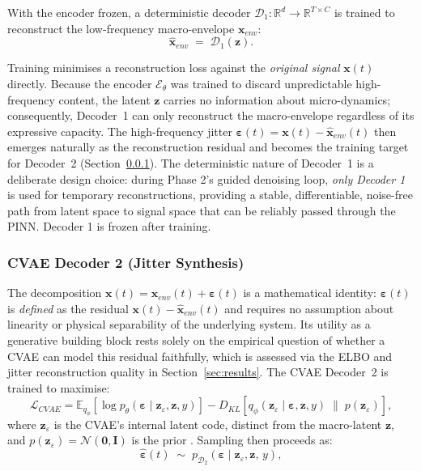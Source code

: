 \documentclass[conference]{IEEEtran}
\newcommand{\Enc}{\mathcal{E}}
\newcommand{\DecOne}{\mathcal{D}_1}
\newcommand{\DecTwo}{\mathcal{D}_2}
\newcommand{\z}{\mathbf{z}}
\newcommand{\x}{\mathbf{x}}
\begin{document}
With the encoder frozen, a deterministic decoder $\DecOne:\mathbb{R}^d\to\mathbb{R}^{T\times C}$ is trained to reconstruct the low-frequency macro-envelope $\x_{env}$:
\begin{equation}
  \hat{\x}_{env} \;=\; \DecOne(\z).
  \label{eq:dec1}
\end{equation}

Training minimises a reconstruction loss against the \emph{original signal} $\x(t)$ directly. Because the encoder $\Enc_\theta$ was trained to discard unpredictable high-frequency content, the latent $\z$ carries no information about micro-dynamics; consequently, Decoder~1 can only reconstruct the macro-envelope regardless of its expressive capacity. The high-frequency jitter $\boldsymbol{\varepsilon}(t)=\x(t)-\hat{\x}_{env}(t)$ then emerges naturally as the reconstruction residual and becomes the training target for Decoder~2 (Section~\ref{sec:arch_d2}). The deterministic nature of Decoder~1 is a deliberate design choice: during Phase 2's guided denoising loop, \emph{only Decoder 1} is used for temporary reconstructions, providing a stable, differentiable, noise-free path from latent space to signal space that can be reliably passed through the PINN. Decoder 1 is frozen after training.

\subsubsection{CVAE Decoder 2 (Jitter Synthesis)}
\label{sec:arch_d2}

The decomposition $\x(t)=\x_{env}(t)+\boldsymbol{\varepsilon}(t)$ is a mathematical identity: $\boldsymbol{\varepsilon}(t)$ is \emph{defined} as the residual $\x(t)-\hat{\x}_{env}(t)$ and requires no assumption about linearity or physical separability of the underlying system. Its utility as a generative building block rests solely on the empirical question of whether a CVAE can model this residual faithfully, which is assessed via the ELBO and jitter reconstruction quality in Section~\ref{sec:results}. The CVAE Decoder~2 is trained to maximise:
\begin{equation}
  \mathcal{L}_{CVAE} = \mathbb{E}_{q_\phi}\!\left[
    \log p_\theta(\boldsymbol{\varepsilon}\mid\z_\varepsilon,\z,y)
  \right]
  - D_{KL}\!\left[
    q_\phi(\z_\varepsilon\mid\boldsymbol{\varepsilon},\z,y)
    \;\|\;
    p(\z_\varepsilon)
  \right],
  \label{eq:elbo}
\end{equation}
where $\z_\varepsilon$ is the CVAE's internal latent code, distinct from the macro-latent $\z$, and $p(\z_\varepsilon)=\mathcal{N}(\mathbf{0},\mathbf{I})$ is the prior \cite{sohn2015cvae}. Sampling then proceeds as:
\begin{equation}
  \hat{\boldsymbol{\varepsilon}}(t) \;\sim\;
    p_{\DecTwo}(\boldsymbol{\varepsilon}\mid\z_\varepsilon,\z,\,y),
  \label{eq:cvae}
\end{equation}
\end{document}
